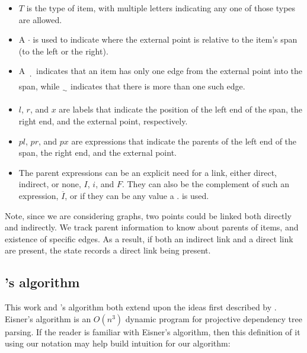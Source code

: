 \begin{itemize}
  \item $T$ is the type of item, with multiple letters indicating any one of those types are allowed.
  \item A $\cdotp$ is used to indicate where the external point is relative to the item's span (to the left or the right).
  \item A $\dotuline{\hspace{2mm}}$ indicates that an item has only one edge from the external point into the span, while $\uwave{\hspace{2mm}}$ indicates that there is more than one such edge.
  \item $l$, $r$, and $x$ are labels that indicate the position of the left end of the span, the right end, and the external point, respectively.
  \item $pl$, $pr$, and $px$ are expressions that indicate the parents of the left end of the span, the right end, and the external point.
  \item The parent expressions can be an explicit need for a link, either direct, indirect, or none, \myeg $I$, $i$, and $F$.
  They can also be the complement of such an expression, \myeg $\overline{I}$, or if they can be any value a $.$ is used.
\end{itemize}

Note, since we are considering graphs, two points could be linked both directly and indirectly.
We track parent information to know about parents of items, and existence of specific edges.
As a result, if both an indirect link and a direct link are present, the state records a direct link being present.

\subsection{\textcite{eisner:1996}'s algorithm}

This work and \textcite{ec}'s algorithm both extend upon the ideas first described by \textcite{eisner:1996}.
Eisner's algorithm is an $O(n^3)$ dynamic program for projective dependency tree parsing.
If the reader is familiar with Eisner's algorithm, then this definition of it using our notation may help build intuition for our algorithm:

